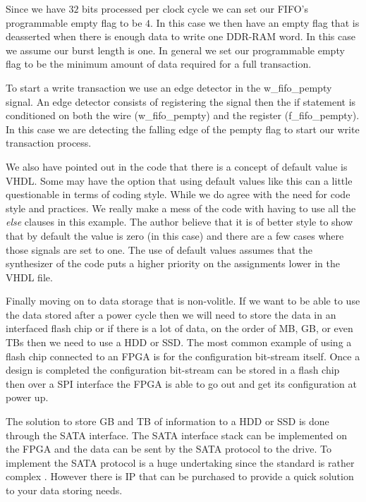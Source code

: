 Since we have $32$ bits processed per clock cycle we can set our \ac{FIFO}'s programmable empty flag to be $4$. In this case we then have an empty flag that is deasserted when there is enough data to write one \ac{DDR}-\ac{RAM} word. In this case we assume our burst length is one. In general we set our programmable empty flag to be the minimum amount of data required for a full transaction. 

To start a write transaction we use an edge detector in the w\_fifo\_pempty signal. An edge detector consists of registering the signal then the if statement is conditioned on both the wire (w\_fifo\_pempty) and the register (f\_fifo\_pempty). In this case we are detecting the falling edge of the pempty flag to start our write transaction process.

We also have pointed out in the code that there is a concept of default value is \ac{VHDL}. Some may have the option that using default values like this can a little questionable in terms of coding style. While we do agree with the need for code style and practices. We really make a mess of the code with having to use all the \emph{else} clauses in this example. The author believe that it is of better style to show that by default the value is zero (in this case) and there are a few cases where those signals are set to one. The use of default values assumes that the synthesizer of the code puts a higher priority on the assignments lower in the \ac{VHDL} file. 

Finally moving on to data storage that is non-volitle. If we want to be able to use the data stored after a power cycle then we will need to store the data in an interfaced flash chip or if there is a lot of data, on the order of \ac{MB}, \ac{GB}, or even \ac{TB}s then we need to use a \ac{HDD} or \ac{SSD}. The most common example of using a flash chip connected to an \ac{FPGA} is for the configuration bit-stream itself. Once a design is completed the configuration bit-stream can be stored in a flash chip then over a \ac{SPI} interface the \ac{FPGA} is able to go out and get its configuration at power up. 

The solution to store \ac{GB} and \ac{TB} of information to a \ac{HDD} or \ac{SSD} is done through the \ac{SATA} interface. The \ac{SATA} interface stack can be implemented on the \ac{FPGA} and the data can be sent by the \ac{SATA} protocol to the drive. To implement the \ac{SATA} protocol is a huge undertaking since the standard is rather complex \cite{sata_std}. However there is \ac{IP} that can be purchased to provide a quick solution to your data storing needs. 	
	
